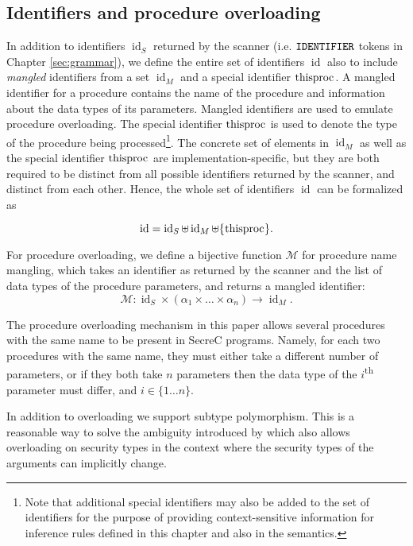 \documentclass[a4paper, 10pt, draft]{report}
\newcommand{\mycode}[1]{\ensuremath{\mbox{\lstinline{#1}}}}
\newcommand{\bnfM}[1]{\ensuremath{\mbox{\textcolor{black}{\texttt{\uppercase{#1}}}}}} %
\begin{document}
\subsection{Identifiers and procedure overloading}\label{sec:checking:typing:identifiers}
In addition to identifiers $\operatorname{id}_S$ returned by the scanner (i.e.
  \bnfM{IDENTIFIER} tokens in Chapter \ref{sec:grammar}), we define the
entire set of identifiers $\operatorname{id}$ also to include \textit{mangled}
identifiers from a set $\operatorname{id}_M$ and a special identifier
\mycode{thisproc}. A mangled identifier for a procedure contains the name of
the procedure and information about the data types of its parameters. Mangled
identifiers are used to emulate procedure overloading. The special identifier
\mycode{thisproc} is used to denote the type of the procedure being
processed\footnote{Note that additional special identifiers may also be added
to the set of identifiers for the purpose of providing context-sensitive
information for inference rules defined in this chapter and also in the
semantics.}. The concrete set of elements in $\operatorname{id}_M$ as well
as the special identifier \mycode{thisproc} are implementation-specific,
but they are both required to be distinct from all possible identifiers
returned by the scanner, and distinct from each other. Hence, the whole set
of identifiers $\operatorname{id}$ can be formalized as

\[
\operatorname{id} = \operatorname{id}_S \uplus \operatorname{id}_M \uplus \{\mycode{thisproc}\}.
\]

For procedure overloading, we define a bijective function $\mathcal{M}$ for
procedure name mangling, which takes an identifier as returned by the scanner
and the list of data types of the procedure parameters, and returns a mangled
identifier:
\[
\mathcal{M} : \operatorname{id}_S \times \left(\alpha_1 \times \ldots \times \alpha_n \right) \rightarrow \operatorname{id}_M.
\]

The procedure overloading mechanism in this paper
allows several procedures with the same name to be present in SecreC programs.
Namely, for each two procedures with the same name, they must either take a
different number of parameters, or if they both take $n$ parameters then the
data type of the $i$\textsuperscript{th} parameter must differ, and
$i\in\{1\ldots n\}$.

In addition to overloading we support subtype polymorphism.  This is a
reasonable way to solve the ambiguity introduced by \cite{SECREC} which also
allows overloading on security types in the context where the security types of
the arguments can implicitly change.
\end{document}
